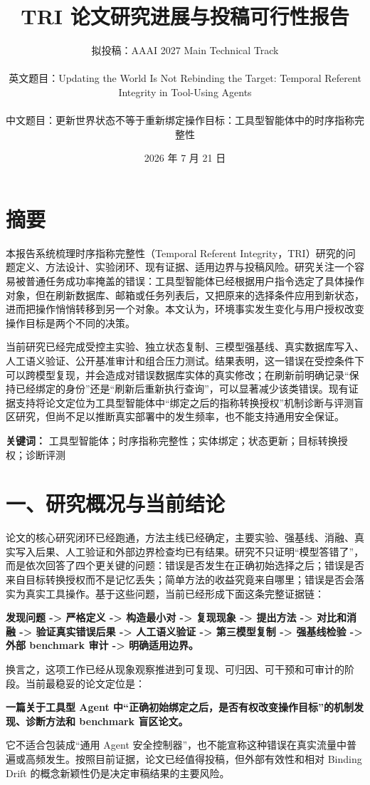 \documentclass[10pt,fontset=none]{ctexart}
\title{\vspace{-1.2cm}\textbf{TRI 论文研究进展与投稿可行性报告}}
\author{拟投稿：AAAI 2027 Main Technical Track\\
\parbox{0.92\textwidth}{\centering\small 英文题目：Updating the World Is Not Rebinding the Target: Temporal Referent Integrity in Tool-Using Agents}\\
中文题目：更新世界状态不等于重新绑定操作目标：工具型智能体中的时序指称完整性}
\date{2026 年 7 月 21 日}
\begin{document}
\maketitle
\thispagestyle{fancy}
\section{摘要}
\par 本报告系统梳理时序指称完整性（Temporal Referent Integrity，TRI）研究的问题定义、方法设计、实验闭环、现有证据、适用边界与投稿风险。研究关注一个容易被普通任务成功率掩盖的错误：工具型智能体已经根据用户指令选定了具体操作对象，但在刷新数据库、邮箱或任务列表后，又把原来的选择条件应用到新状态，进而把操作悄悄转移到另一个对象。本文认为，环境事实发生变化与用户授权改变操作目标是两个不同的决策。
\par 当前研究已经完成受控主实验、独立状态复制、三模型强基线、真实数据库写入、人工语义验证、公开基准审计和组合压力测试。结果表明，这一错误在受控条件下可以跨模型复现，并会造成对错误数据库实体的真实修改；在刷新前明确记录“保持已经绑定的身份”还是“刷新后重新执行查询”，可以显著减少该类错误。现有证据支持将论文定位为工具型智能体中“绑定之后的指称转换授权”机制诊断与评测盲区研究，但尚不足以推断真实部署中的发生频率，也不能支持通用安全保证。
\par \textbf{关键词：} 工具型智能体；时序指称完整性；实体绑定；状态更新；目标转换授权；诊断评测
\section{一、研究概况与当前结论}
\par 论文的核心研究闭环已经跑通，方法主线已经确定，主要实验、强基线、消融、真实写入后果、人工验证和外部边界检查均已有结果。研究不只证明“模型答错了”，而是依次回答了四个更关键的问题：错误是否发生在正确初始选择之后；错误是否来自目标转换授权而不是记忆丢失；简单方法的收益究竟来自哪里；错误是否会落实为真实工具操作。基于这些问题，当前已经形成下面这条完整证据链：
\par \textbf{发现问题 -> 严格定义 -> 构造最小对 -> 复现现象 -> 提出方法 -> 对比和消融 -> 验证真实错误后果 -> 人工语义验证 -> 第三模型复制 -> 强基线检验 -> 外部 benchmark 审计 -> 明确适用边界。}
\par 换言之，这项工作已经从现象观察推进到可复现、可归因、可干预和可审计的阶段。当前最稳妥的论文定位是：
\par \textbf{一篇关于工具型 Agent 中“正确初始绑定之后，是否有权改变操作目标”的机制发现、诊断方法和 benchmark 盲区论文。}
\par 它不适合包装成“通用 Agent 安全控制器”，也不能宣称这种错误在真实流量中普遍或高频发生。按照目前证据，论文已经值得投稿，但外部有效性和相对 Binding Drift 的概念新颖性仍是决定审稿结果的主要风险。
\end{document}
